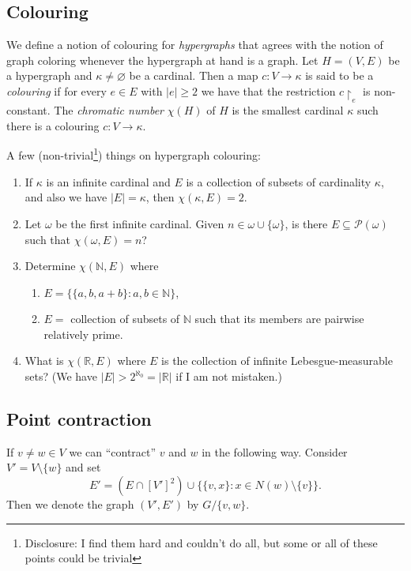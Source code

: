 \documentclass[12pt, a4paper]{amsart}
\begin{document}
\subsection{Colouring} We define a notion of colouring for {\em 
hypergraphs} that agrees with the notion of graph coloring whenever
the hypergraph at hand is a graph. Let $H=(V,E)$ be a hypergraph and 
$\kappa\neq \varnothing$ 
be a cardinal.
Then a map $c:V\to \kappa$ is said to be a {\em colouring} if for
every $e\in E$ with $|e|\geq 2$ we have that
the restriction $c\restriction_e$ is non-constant. The {\em chromatic
number} $\chi(H)$ of $H$ is the smallest cardinal $\kappa$ such there
is a colouring $c:V\to \kappa$.

A few (non-trivial\footnote{Disclosure: I find them hard and couldn't
do all, but some or all of these points could be trivial}) 
things on hypergraph colouring:
\begin{enumerate}
\item If $\kappa$ is an infinite cardinal and $E$ is a collection 
of subsets of cardinality $\kappa$, and also we have $|E| = \kappa$,
then $\chi(\kappa, E) = 2$. 
\item Let $\omega$ be the first infinite cardinal. Given $n\in 
\omega\cup\{\omega\}$, is there $E\subseteq {\mathcal P}(\omega)$
such that $\chi(\omega, E) = n$?
\item Determine $\chi(\mathbb{N}, E)$ where 
\begin{enumerate}
\item $E = \big\{\{a,b,a+b\}: a, b\in \mathbb{N}\big\}$,
\item $E = $ collection of subsets of $\mathbb{N}$ such 
that its members are pairwise relatively prime.
\end{enumerate}
\item What is $\chi(\mathbb{R}, E)$ where $E$ is the collection
	of infinite Lebesgue-measurable sets? (We have $|E| >
		2^{\aleph_0} = |\mathbb{R}|$ if I am not mistaken.)
\end{enumerate}
\subsection{Point contraction}\label{point_contraction} If $v\neq w\in V$ we can ``contract'' 
$v$ and $w$ in the following way. Consider $V' = V\setminus \{w\}$
and set $$E' = (E \cap [V']^2) \cup \big\{\{v,x\}: x\in N(w)
\setminus\{v\}\big\}.$$
Then we denote the graph $(V', E')$ by $G/\{v,w\}$.
\end{document}
